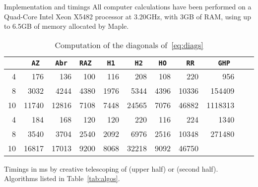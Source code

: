 \documentclass{sig-alt-full}
\begin{document}
\begin{section}{Implementation and timings}
All computer calculations have been performed on a Quad-Core Intel
Xeon X5482 processor at 3.20GHz, with 3GB of RAM, using up to 6.5GB of
memory allocated by Maple.

\begin{table}
\begin{scriptsize}
\begin{center}
\begin{tabular}{r|rrrrrrrrrr}
 & \tt AZ & \tt Abr & \tt RAZ & \tt H1 & \tt H2 & \tt HO & \tt RR & \tt GHP \\
\hline
4 & 176 & 136 & 100 & 116 & 208 & 108 & 220 & 956 \\
8 & 3032 & 4244 & 4380 & 1976 & 5344 & 4396 & 10336 & 154409 \\
10 & 11740 & 12816 & 7108 & 7448 & 24565 & 7076 & 46882 & 1118313 \\
\hline
4 & 184 & 168 & 120 & 120 & 220 & 116 & 224 & 1340 \\
8 & 3540 & 3704 & 2540 & 2092 & 6976 & 2516 & 10348 & 271480 \\
10 & 16817 & 17013 & 9200 & 8068 & 32218 & 9092 & 46750 & 
\end{tabular}
\end{center}
\end{scriptsize}
\vskip-12pt
\caption{Computation of the diagonals of~\eqref{eq:diags}}\label{tab:diags}
\begin{small}
Timings in ms by creative telescoping of  (upper half) or
 (second half).  Algorithms listed in Table~\ref{tab:algos}.
\end{small}
\end{table}


\end{section}
\end{document}
